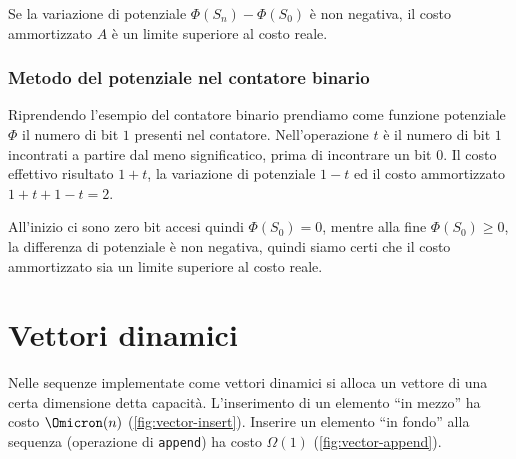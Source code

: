 Se la variazione di potenziale \(\Phi(S_n) - \Phi(S_0)\) è non negativa, il costo ammortizzato \(A\) è un limite superiore al costo reale.

\subsubsection{Metodo del potenziale nel contatore binario}

Riprendendo l'esempio del contatore binario prendiamo come funzione potenziale \(\Phi\) il numero di bit \(1\) presenti nel contatore.
Nell'operazione \increment{} \(t\) è il numero di bit \(1\) incontrati a partire dal meno significatico, prima di incontrare un bit \(0\).
Il costo effettivo risultato \(1+t\), la variazione di potenziale \(1-t\) ed il costo ammortizzato \(1+t + 1-t = 2\).

All'inizio ci sono zero bit accesi quindi \(\Phi(S_0) = 0\), mentre alla fine \(\Phi(S_0) \geqslant 0\), la differenza di potenziale è non negativa, quindi siamo certi che il costo ammortizzato sia un limite superiore al costo reale.

\section{Vettori dinamici}

Nelle sequenze implementate come vettori dinamici si alloca un vettore di una certa dimensione detta capacità.
L'inserimento di un elemento \enquote{in mezzo} ha costo \(\Omicron(n)\) (\cref{fig:vector-insert}).
Inserire un elemento \enquote{in fondo} alla sequenza (operazione di \texttt{append}) ha costo \(\Omega(1)\) (\cref{fig:vector-append}).


